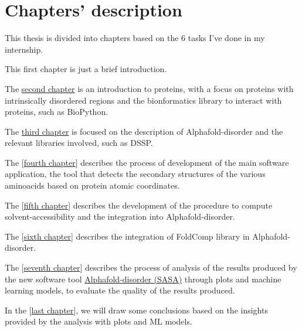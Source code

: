 \section{Chapters' description}
This thesis is divided into chapters based on the 6 tasks I've done in my internship.

This first chapter is just a brief introduction.

The {\hyperref[chp:proteins]{second chapter}} is an introduction to proteins, with a focus on proteins with intrinsically disordered regions and the bionformatics library to interact with proteins, such as BioPython.

The {\hyperref[chp:alphafold-disorder]{third chapter}} is focused on the description of Alphafold-disorder and the relevant libraries involved, such as DSSP.

The [{\hyperref[cap:descrizione-architettura]{fourth chapter}}] describes the process of development of the main software application, the tool that detects the secondary structures of the various aminoacids based on protein atomic coordinates.

The [{\hyperref[cap:descrizione-architettura]{fifth chapter}}] describes the development of the procedure to compute solvent-accessibility and the integration into Alphafold-disorder.

The [{\hyperref[cap:descrizione-architettura]{sixth chapter}}] describes the integration of FoldComp library in Alphafold-disorder.

The [{\hyperref[cap:descrizione-architettura]{seventh chapter}}] describes the process of analysis of the results produced by the new software tool \underline{Alphafold-disorder (SASA)} through plots and machine learning models, to evaluate the quality of the results produced.

In the [{\hyperref[cap:descrizione-architettura]{last chapter}}], we will draw some conclusions based on the insights provided by the analysis with plots and ML models.


